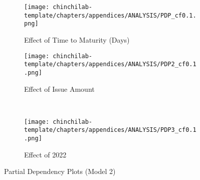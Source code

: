\begin{figure}[H]
\centering
   \begin{subfigure}[b]{0.45\textwidth}
    \texttt{[image: chinchilab-template/chapters/appendices/ANALYSIS/PDP\_cf0.1.png]}
    \caption{Effect of Time to Maturity (Days)}
   \label{fig:Ng1} 
\end{subfigure}
\begin{subfigure}[b]{0.45\textwidth}
    \texttt{[image: chinchilab-template/chapters/appendices/ANALYSIS/PDP2\_cf0.1.png]}
    \caption{Effect of Issue Amount}
   \label{fig:Ng2}
\end{subfigure}
\\
\begin{subfigure}[b]{0.45\textwidth}
    \texttt{[image: chinchilab-template/chapters/appendices/ANALYSIS/PDP3\_cf0.1.png]}
    \caption{Effect of 2022}
   \label{fig:Ng2}
\end{subfigure}
\caption{Partial Dependency Plots (Model 2)}
\end{figure}

